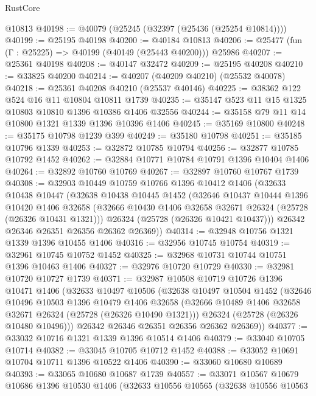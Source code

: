 \begin{lexlean}{RustCore}
\begin{coremodule}
    @10813
@40198 := @40079 (@25245 (@32397 (@25436 (@25254 @10814))))
@40199 := @25195 @40198
@40200 := @40184 @10813
@40206 := @25477 (fun (Γ : @25225) => @40199 (@40149 (@25443 @40200))) @25986
@40207 := @25361 @40198
@40208 := @40147 @32472
@40209 := @25195 @40208
@40210 := @33825 @40200
@40214 := @40207 (@40209 @40210) (@25532 @40078)
@40218 := @25361 @40208 @40210 (@25537 @40146)
@40225 := @38362 @122 @524 @16 @11 @10804 @10811 @1739
@40235 := @35147 @523 @11 @15 @1325 @10803 @10810 @1396 @10386 @1406 @32556
@40244 := @35158 @79 @11 @14 @10800 @1321 @1339 @1396 @10396 @1406
@40245 := @35169 @10800
@40248 := @35175 @10798 @1239 @399
@40249 := @35180 @10798
@40251 := @35185 @10796 @1339
@40253 := @32872 @10785 @10794
@40256 := @32877 @10785 @10792 @1452
@40262 := @32884 @10771 @10784 @10791 @1396 @10404 @1406
@40264 := @32892 @10760 @10769
@40267 := @32897 @10760 @10767 @1739
@40308 := @32903
    @10449
    @10759
    @10766
    @1396
    @10412
    @1406
    (@32633
      @10438
      @10447
      (@32638
        @10438
        @10445
        @1452
        (@32646
          @10437
          @10444
          @1396
          @10420
          @1406
          @32658
          (@32666 @10430 @1406 @32658 @32671 @26324 (@25728 (@26326 @10431 @1321)))
          @26324
          (@25728 (@26326 @10421 @10437)))
        @26342
        @26346
        @26351
        @26356
        @26362
        @26369))
@40314 := @32948 @10756 @1321 @1339 @1396 @10455 @1406
@40316 := @32956 @10745 @10754
@40319 := @32961 @10745 @10752 @1452
@40325 := @32968 @10731 @10744 @10751 @1396 @10463 @1406
@40327 := @32976 @10720 @10729
@40330 := @32981 @10720 @10727 @1739
@40371 := @32987
    @10508
    @10719
    @10726
    @1396
    @10471
    @1406
    (@32633
      @10497
      @10506
      (@32638
        @10497
        @10504
        @1452
        (@32646
          @10496
          @10503
          @1396
          @10479
          @1406
          @32658
          (@32666 @10489 @1406 @32658 @32671 @26324 (@25728 (@26326 @10490 @1321)))
          @26324
          (@25728 (@26326 @10480 @10496)))
        @26342
        @26346
        @26351
        @26356
        @26362
        @26369))
@40377 := @33032 @10716 @1321 @1339 @1396 @10514 @1406
@40379 := @33040 @10705 @10714
@40382 := @33045 @10705 @10712 @1452
@40388 := @33052 @10691 @10704 @10711 @1396 @10522 @1406
@40390 := @33060 @10680 @10689
@40393 := @33065 @10680 @10687 @1739
@40557 := @33071
    @10567
    @10679
    @10686
    @1396
    @10530
    @1406
    (@32633
      @10556
      @10565
      (@32638
        @10556
        @10563

\end{coremodule}
\end{lexlean}
